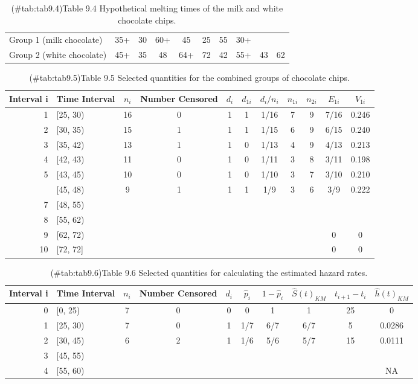 \documentclass[
]{report}
\begin{document}
\begin{table}[!h]
\centering
\caption{(\#tab:tab9.4)Table 9.4 Hypothetical melting times of the milk and white chocolate chips.}
\centering
\begin{tabular}[t]{llcccccccc}
\toprule
  &  &  &  &  &  &  &  &  & \\
\midrule
Group 1 (milk chocolate) & 35+ & 30 & 60+ & 45 & 25 & 55 & 30+ &  & \\
Group 2 (white chocolate) & 45+ & 35 & 48 & 64+ & 72 & 42 & 55+ & 43 & 62\\
\bottomrule
\end{tabular}
\end{table}

\begin{table}[!h]
\centering
\caption{(\#tab:tab9.5)Table 9.5 Selected quantities for the combined groups of chocolate chips.}
\centering
\begin{tabular}[t]{rlccccccccc}
\toprule
Interval i & Time Interval & $n_i$ & Number Censored & $d_i$ & $d_{1i}$ & $d_i/n_i$ & $n_{1i}$ & $n_{2i}$ & $E_{1i}$ & $V_{1i}$\\
\midrule
1 & {}[25, 30) & 16 & 0 & 1 & 1 & 1/16 & 7 & 9 & 7/16 & 0.246\\
2 & {}[30, 35) & 15 & 1 & 1 & 1 & 1/15 & 6 & 9 & 6/15 & 0.240\\
3 & {}[35, 42) & 13 & 1 & 1 & 0 & 1/13 & 4 & 9 & 4/13 & 0.213\\
4 & {}[42, 43) & 11 & 0 & 1 & 0 & 1/11 & 3 & 8 & 3/11 & 0.198\\
5 & {}[43, 45) & 10 & 0 & 1 & 0 & 1/10 & 3 & 7 & 3/10 & 0.210\\
\addlinespace
6 & {}[45, 48) & 9 & 1 & 1 & 1 & 1/9 & 3 & 6 & 3/9 & 0.222\\
7 & {}[48, 55) &  &  &  &  &  &  &  &  & \\
8 & {}[55, 62) &  &  &  &  &  &  &  &  & \\
9 & {}[62, 72) &  &  &  &  &  &  &  & 0 & 0\\
10 & {}[72, 72] &  &  &  &  &  &  &  & 0 & 0\\
\bottomrule
\end{tabular}
\end{table}

\begin{table}[!h]
\centering
\caption{(\#tab:tab9.6)Table 9.6 Selected quantities for calculating the estimated hazard rates.}
\centering
\begin{tabular}[t]{rlcccccccc}
\toprule
Interval i & Time Interval & $n_i$ & Number Censored & $d_i$ & $\hat{p}_i$ & $1 - \hat{p}_i$ & $\hat{S}(t)_{KM}$ & $t_{i+1} - t_i$ & $\hat{h}(t)_{KM}$\\
\midrule
0 & {}[0, 25) & 7 & 0 & 0 & 0 & 1 & 1 & 25 & 0\\
1 & {}[25, 30) & 7 & 0 & 1 & 1/7 & 6/7 & 6/7 & 5 & 0.0286\\
2 & {}[30, 45) & 6 & 2 & 1 & 1/6 & 5/6 & 5/7 & 15 & 0.0111\\
3 & {}[45, 55) &  &  &  &  &  &  &  & \\
4 & {}[55, 60) &  &  &  &  &  &  &  & NA\\
\bottomrule
\end{tabular}
\end{table}
\end{document}
